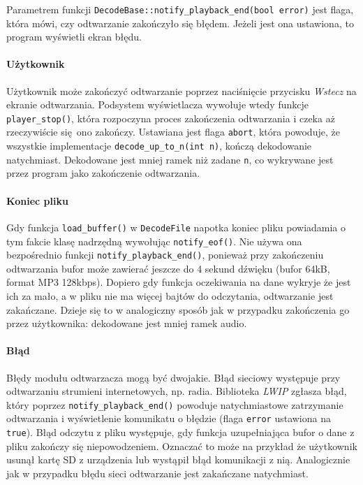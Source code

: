 \documentclass[polish]{aghengthesis}
\begin{document}
			Parametrem funkcji \lstinline|DecodeBase::notify_playback_end(bool error)| jest flaga, która mówi, czy odtwarzanie zakończyło się błędem. Jeżeli jest ona ustawiona, to program wyświetli ekran błędu.
			
			\paragraph{Użytkownik}
				Użytkownik może zakończyć odtwarzanie poprzez naciśnięcie przycisku \textit{Wstecz} na ekranie odtwarzania. Podsystem wyświetlacza wywołuje wtedy funkcje \lstinline|player_stop()|, która rozpoczyna proces zakończenia odtwarzania i czeka aż rzeczywiście się ono zakończy. Ustawiana jest flaga \lstinline|abort|, która powoduje, że wszystkie implementacje \lstinline|decode_up_to_n(int n)|, kończą dekodowanie natychmiast. Dekodowane jest mniej ramek niż zadane \lstinline|n|, co wykrywane jest przez program jako zakończenie odtwarzania.
			
			\paragraph{Koniec pliku}
				Gdy funkcja \lstinline|load_buffer()| w \lstinline|DecodeFile| napotka koniec pliku powiadamia o tym fakcie klasę nadrzędną wywołując \lstinline|notify_eof()|. Nie używa ona bezpośrednio funkcji \lstinline|notify_playback_end()|, ponieważ przy zakończeniu odtwarzania bufor może zawierać jeszcze do 4 sekund dźwięku (bufor 64kB, format MP3 128kbps). Dopiero gdy funkcja oczekiwania na dane wykryje że jest ich za mało, a w pliku nie ma więcej bajtów do odczytania, odtwarzanie jest zakańczane. Dzieje się to w analogiczny sposób jak w przypadku zakończenia go przez użytkownika: dekodowane jest mniej ramek audio.
			
			\paragraph{Błąd}
				Błędy modułu odtwarzacza mogą być dwojakie. Błąd sieciowy występuje przy odtwarzaniu strumieni internetowych, np. radia. Biblioteka \textit{LWIP} zgłasza błąd, który poprzez \lstinline|notify_playback_end()| powoduje natychmiastowe zatrzymanie odtwarzania i wyświetlenie komunikatu o błędzie (flaga \lstinline|error| ustawiona na \lstinline|true|). Błąd odczytu z pliku występuje, gdy funkcja uzupełniająca bufor o dane z pliku zakończy się niepowodzeniem. Oznaczać to może na przykład że użytkownik usunął kartę SD z urządzenia lub wystąpił błąd komunikacji z nią. Analogicznie jak w przypadku błędu sieci odtwarzanie jest zakańczane natychmiast.
			
\end{document}
